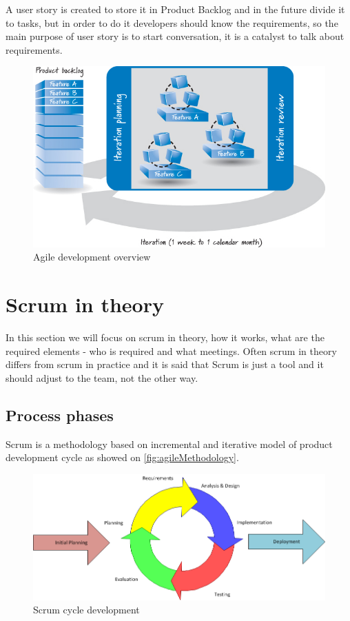 A user story is created to store it in Product Backlog and in the future divide it to tasks, but in order to do it developers should know the requirements, so the main purpose of user story is to start conversation, it is a catalyst to talk about requirements.

\begin{figure}[h]
\caption{Agile development overview \cite{ScrumBook}}
\label{fig:agileDiagram}
\centering
\includegraphics[width=1\textwidth]{img/agileDiagram}
\end{figure}

\section{Scrum in theory}
In this section we will focus on scrum in theory, how it works, what are the required elements - who is required and what meetings. Often scrum in theory differs from scrum in practice and it is said that Scrum is just a tool and it should adjust to the team, not the other way.
\subsection{Process phases}
Scrum is a methodology based on incremental and iterative model of product development cycle as showed on \autoref{fig:agileMethodology}.

\begin{figure}[h]
\caption{ Scrum cycle development}
\label{fig:agileMethodology}
\centering
\includegraphics[width=1\textwidth]{img/iterativeScrum}
\end{figure}

